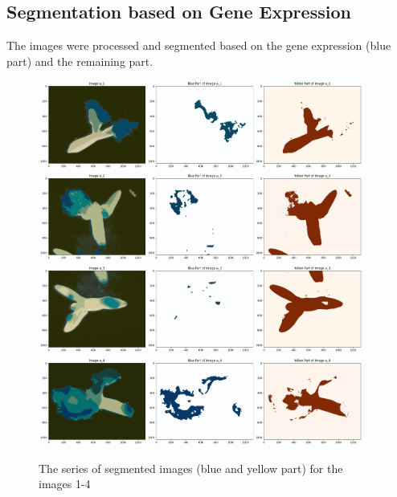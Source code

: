 \documentclass{article}
\begin{document}
\subsection*{Segmentation based on Gene Expression} 
\label{sec:Segmentation}
The images were processed and segmented based on the gene expression (blue part) and the remaining part. 
\begin{figure}[h!]
\centering
\includegraphics[width=0.95\textwidth]{Report/Images/Appendix Images/ColorSegments/Image1.png}
\includegraphics[width=0.95\textwidth]{Report/Images/Appendix Images/ColorSegments/Image2.png}
\includegraphics[width=0.95\textwidth]{Report/Images/Appendix Images/ColorSegments/Image3.png}
\includegraphics[width=0.95\textwidth]{Report/Images/Appendix Images/ColorSegments/Image4.png}
\caption{The series of segmented images (blue and yellow part) for the images 1-4} 
\label{fig:segment1-4}
\end{figure}
\end{document}
